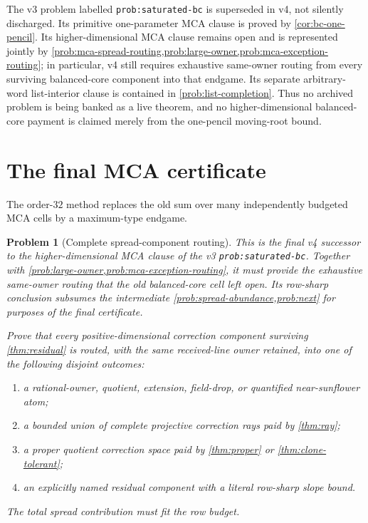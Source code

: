 \documentclass[11pt,a4paper]{amsart}
\numberwithin{equation}{section}
\newtheorem{problem}[theorem]{Problem}
\theoremstyle{remark}
\begin{document}
\begin{remark}
\label{rem:saturated-bc-status}
The v3 problem labelled \texttt{prob:saturated-bc} is superseded in v4, not
silently discharged.  Its primitive one-parameter MCA clause is proved by
\cref{cor:bc-one-pencil}.  Its higher-dimensional MCA clause remains open and
is represented jointly by
\cref{prob:mca-spread-routing,prob:large-owner,prob:mca-exception-routing};
in particular, v4 still requires exhaustive same-owner routing from every
surviving balanced-core component into that endgame.  Its separate
arbitrary-word list-interior clause is contained in
\cref{prob:list-completion}.  Thus no archived problem is being banked as a
live theorem, and no higher-dimensional balanced-core payment is claimed
merely from the one-pencil moving-root bound.
\end{remark}

\section{The final MCA certificate}
\label{sec:mca-final-certificate}
The order-$32$ method replaces the old sum over many independently budgeted MCA cells by a maximum-type endgame.

\begin{problem}[Complete spread-component routing]\label{prob:mca-spread-routing}
This is the final v4 successor to the higher-dimensional MCA clause of the
v3 \texttt{prob:saturated-bc}.  Together with
\cref{prob:large-owner,prob:mca-exception-routing}, it must provide the
exhaustive same-owner routing that the old balanced-core cell left open.  Its
row-sharp conclusion subsumes the intermediate
\cref{prob:spread-abundance,prob:next} for purposes of the final certificate.

Prove that every positive-dimensional correction component surviving \cref{thm:residual} is routed, with the same received-line owner retained, into one of the following disjoint outcomes:
\begin{enumerate}[label=\textup{(\alph*)}]
\item a rational-owner, quotient, extension, field-drop, or quantified near-sunflower atom;
\item a bounded union of complete projective correction rays paid by \cref{thm:ray};
\item a proper quotient correction space paid by \cref{thm:proper} or \cref{thm:clone-tolerant};
\item an explicitly named residual component with a literal row-sharp slope bound.
\end{enumerate}
The total spread contribution must fit the row budget.
\end{problem}
\end{document}
